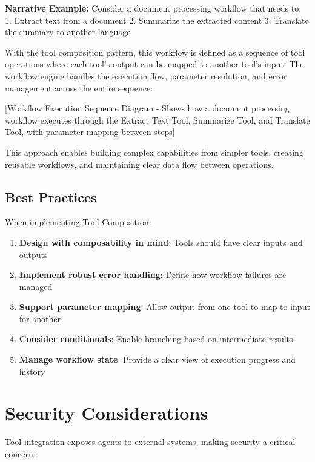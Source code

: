 \documentclass[11pt,oneside]{book}
\providecommand{\tightlist}{%
  \setlength{\itemsep}{0pt}\setlength{\parskip}{0pt}}
\begin{document}
\textbf{Narrative Example:} Consider a document processing workflow that
needs to: 1. Extract text from a document 2. Summarize the extracted
content 3. Translate the summary to another language

With the tool composition pattern, this workflow is defined as a
sequence of tool operations where each tool's output can be mapped to
another tool's input. The workflow engine handles the execution flow,
parameter resolution, and error management across the entire sequence:

{[}Workflow Execution Sequence Diagram - Shows how a document processing
workflow executes through the Extract Text Tool, Summarize Tool, and
Translate Tool, with parameter mapping between steps{]}

This approach enables building complex capabilities from simpler tools,
creating reusable workflows, and maintaining clear data flow between
operations.

\subsection{Best Practices}\label{best-practices-4}

When implementing Tool Composition:

\begin{enumerate}
\def\labelenumi{\arabic{enumi}.}
\tightlist
\item
  \textbf{Design with composability in mind}: Tools should have clear
  inputs and outputs
\item
  \textbf{Implement robust error handling}: Define how workflow failures
  are managed
\item
  \textbf{Support parameter mapping}: Allow output from one tool to map
  to input for another
\item
  \textbf{Consider conditionals}: Enable branching based on intermediate
  results
\item
  \textbf{Manage workflow state}: Provide a clear view of execution
  progress and history
\end{enumerate}

\section{Security Considerations}\label{security-considerations}

Tool integration exposes agents to external systems, making security a
critical concern:
\end{document}
